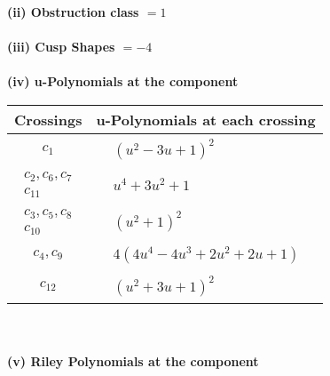 \documentclass[1p]{elsarticle_modified}
\theoremstyle{definition}
\begin{document}
\flushleft \textbf{(ii) Obstruction class $= 1$}\\~\\
\flushleft \textbf{(iii) Cusp Shapes $= -4$}\\~\\
\newpage\renewcommand{\arraystretch}{1}
\flushleft \textbf{(iv) u-Polynomials at the component}\newline \\
\begin{tabular}{m{50pt}|m{274pt}}
Crossings & \hspace{64pt}u-Polynomials at each crossing \\
\hline $$\begin{aligned}c_{1}\end{aligned}$$&$\begin{aligned}
&(u^2-3 u+1)^2
\end{aligned}$\\
\hline $$\begin{aligned}c_{2},c_{6},c_{7}\\c_{11}\end{aligned}$$&$\begin{aligned}
&u^4+3 u^2+1
\end{aligned}$\\
\hline $$\begin{aligned}c_{3},c_{5},c_{8}\\c_{10}\end{aligned}$$&$\begin{aligned}
&(u^2+1)^2
\end{aligned}$\\
\hline $$\begin{aligned}c_{4},c_{9}\end{aligned}$$&$\begin{aligned}
&4(4 u^4-4 u^3+2 u^2+2 u+1)
\end{aligned}$\\
\hline $$\begin{aligned}c_{12}\end{aligned}$$&$\begin{aligned}
&(u^2+3 u+1)^2
\end{aligned}$\\
\hline
\end{tabular}\\~\\
\newpage\renewcommand{\arraystretch}{1}
\flushleft \textbf{(v) Riley Polynomials at the component}\newline \\
\end{document}
